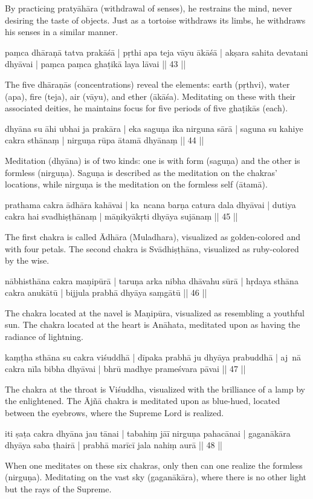 By practicing pratyāhāra (withdrawal of senses), he restrains the mind, never desiring the taste of objects. Just as a tortoise withdraws its limbs, he withdraws his senses in a similar manner.

paṃca dhāraṇā tatva prakāśā | pṛthi apa teja vāyu ākāśā |
akṣara sahita devatani dhyāvai | paṃca paṃca ghaṭikā laya lāvai || 43 || 

The five dhāraṇās (concentrations) reveal the elements: earth (pṛthvi), water (apa), fire (teja), air (vāyu), and ether (ākāśa). Meditating on these with their associated deities, he maintains focus for five periods of five ghaṭikās (each).

dhyāna su āhi ubhai ja prakāra | eka saguṇa ika nirguna sārā | 
saguna su kahiye cakra sthānaṃ | nirguṇa rūpa ātamā dhyānaṃ || 44 || 

Meditation (dhyāna) is of two kinds: one is with form (saguṇa) and the other is formless (nirguṇa). Saguṇa is described as the meditation on the chakras' locations, while nirguṇa is the meditation on the formless self (ātamā).

prathama cakra ādhāra kahāvai | ka~ncana barṇa catura dala dhyāvai |
dutiya cakra hai svadhiṣṭhānaṃ | māṇikyākṛti dhyāya sujānaṃ || 45 ||

The first chakra is called Ādhāra (Muladhara), visualized as golden-colored and with four petals. The second chakra is Svādhiṣṭhāna, visualized as ruby-colored by the wise.

nābhisthāna cakra maṇipūrā | taruṇa arka nibha dhāvahu sūrā |
hṛdaya sthāna cakra anukātū | bijjula prabhā dhyāya saṃgātū || 46 ||

The chakra located at the navel is Maṇipūra, visualized as resembling a youthful sun. The chakra located at the heart is Anāhata, meditated upon as having the radiance of lightning.

kaṃṭha sthāna su cakra viśuddhā | dīpaka prabhā ju dhyāya prabuddhā |
aj~nā cakra nīla bibha dhyāvai | bhrū madhye prameśvara pāvai || 47 ||

The chakra at the throat is Viśuddha, visualized with the brilliance of a lamp by the enlightened. The Ājñā chakra is meditated upon as blue-hued, located between the eyebrows, where the Supreme Lord is realized.

iti ṣaṭa cakra dhyāna jau tānai | tabahiṃ jāī nirguṇa pahacānai | 
gaganākāra dhyāya saba ṭhairā | prabhā marīcī jala nahiṃ aurā || 48 ||  

When one meditates on these six chakras, only then can one realize the formless (nirguṇa). Meditating on the vast sky (gaganākāra), where there is no other light but the rays of the Supreme.

